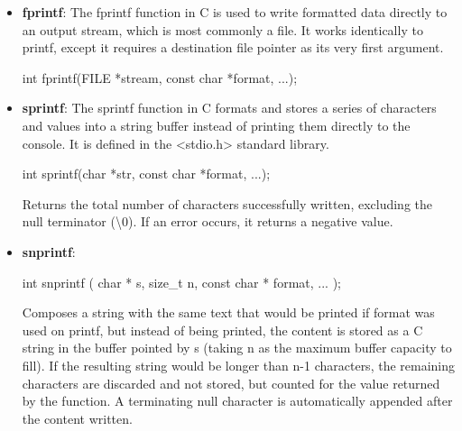 \documentclass{report}
\begin{document}
\begin{itemize}
\begin{cppcode}
            \end{cppcode}
            \bigbreak \noindent 
            For \%p, cast the pointer to void*. Note that the language itself does not make printf typesafe. Wrong format specifiers cause \textbf{undefined behavior}.
        \item \textbf{fprintf}: The fprintf function in C is used to write formatted data directly to an output stream, which is most commonly a file. It works identically to printf, except it requires a destination file pointer as its very first argument. 
            \bigbreak \noindent 
            \begin{cppcode}
            int fprintf(FILE *stream, const char *format, ...);
            \end{cppcode}
        \item \textbf{sprintf}: The sprintf function in C formats and stores a series of characters and values into a string buffer instead of printing them directly to the console. It is defined in the <stdio.h> standard library.
            \bigbreak \noindent 
            \begin{cppcode}
            int sprintf(char *str, const char *format, ...); 
            \end{cppcode}
            \bigbreak \noindent 
            Returns the total number of characters successfully written, excluding the null terminator (\textbackslash0). If an error occurs, it returns a negative value. 
        \item \textbf{snprintf}: 
            \bigbreak \noindent 
            \begin{cppcode}
            int snprintf ( char * s, size_t n, const char * format, ... );
            \end{cppcode}
            \bigbreak \noindent 
            Composes a string with the same text that would be printed if format was used on printf, but instead of being printed, the content is stored as a C string in the buffer pointed by s (taking n as the maximum buffer capacity to fill).
            \bigbreak \noindent 
            If the resulting string would be longer than n-1 characters, the remaining characters are discarded and not stored, but counted for the value returned by the function.
            \bigbreak \noindent 
            A terminating null character is automatically appended after the content written.

\end{itemize}
\end{document}

